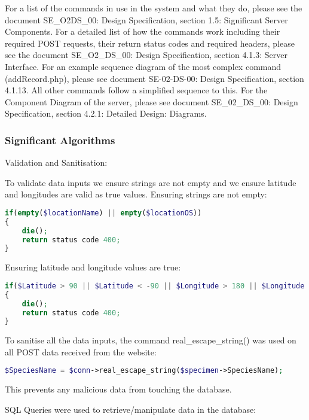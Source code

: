         For a list of the commands in use in the system and what they do, please see the document SE\_O2\-DS\_00: Design Specification, section 1.5: Significant Server Components. For a detailed list of how the commands work including their required POST requests, their return status codes and required headers, please see the document SE\_O2\_DS\_00: Design Specification, section 4.1.3: Server Interface. For an example sequence diagram of the most complex command (addRecord.php), please see document SE-02-DS-00: Design Specification, section 4.1.13. All other commands follow a simplified sequence to this. For the Component Diagram of the server, please see document SE\_02\_DS\_00: Design Specification, section 4.2.1: Detailed Design: Diagrams. 

    \newpage
    \subsubsection{Significant Algorithms}
        Validation and Sanitisation:

        To validate data inputs we ensure strings are not empty and we ensure latitude and longitudes are valid as true values. Ensuring strings are not empty: 
        
        \begin{lstlisting}[language=php]
if(empty($locationName) || empty($locationOS))
{
    die();
    return status code 400;
}
        \end{lstlisting}

        Ensuring latitude and longitude values are true:
    
        \begin{lstlisting}[language=php]
if($Latitude > 90 || $Latitude < -90 || $Longitude > 180 || $Longitude < -180)
{
    die();
    return status code 400;
}
        \end{lstlisting}

        To sanitise all the data inputs, the command real\_escape\_string() was used on all POST data received from the website: 
        
        \begin{lstlisting}[language=php]
$SpeciesName = $conn->real_escape_string($specimen->SpeciesName);
        \end{lstlisting}
        
        This prevents any malicious data from touching the database.

        SQL Queries were used to retrieve/manipulate data in the database:


